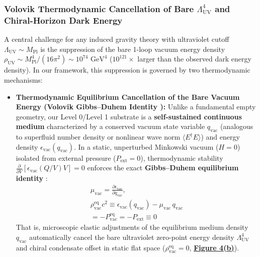 \documentclass[10pt,aps,prd,twocolumn,superscriptaddress,nofootinbib,floatfix,longbibliography,showkeys]{revtex4-2}
\begin{document}
\subsubsection{Volovik Thermodynamic Cancellation of Bare $\Lambda_{\text{UV}}^4$ and Chiral-Horizon Dark Energy}

A central challenge for any induced gravity theory with ultraviolet cutoff $\Lambda_{\text{UV}} \sim M_{\text{Pl}}$ is the suppression of the bare 1-loop vacuum energy density $\rho_{\text{UV}} \sim M_{\text{Pl}}^4 / (16\pi^2) \sim 10^{74}\text{ GeV}^4$ ($10^{121}\times$ larger than the observed dark energy density). In our framework, this suppression is governed by two thermodynamic mechanisms:
\begin{itemize}
  \item \textbf{Thermodynamic Equilibrium Cancellation of the Bare Vacuum Energy (Volovik Gibbs--Duhem Identity \cite{ref15,ref16}):} Unlike a fundamental empty geometry, our Level 0/Level 1 substrate is a \textbf{self-sustained continuous medium} characterized by a conserved vacuum state variable $q_{\text{vac}}$ (analogous to superfluid number density or nonlinear wave norm $\langle E^\dagger E \rangle$) and energy density $\epsilon_{\text{vac}}(q_{\text{vac}})$. In a static, unperturbed Minkowski vacuum ($H = 0$) isolated from external pressure ($P_{\text{ext}} = 0$), thermodynamic stability $\frac{\partial}{\partial V}[\epsilon_{\text{vac}}(Q/V)V] = 0$ enforces the exact \textbf{Gibbs--Duhem equilibrium identity} \cite{ref15,ref16}:
\begin{equation}\begin{gathered}
\mu_{\text{vac}} = \frac{\partial \epsilon_{\text{vac}}}{\partial q_{\text{vac}}}, \\
\rho_{\text{vac}}^{\text{eq}} c^2 \equiv \epsilon_{\text{vac}}(q_{\text{vac}}) - \mu_{\text{vac}}\,q_{\text{vac}} \\
= -P_{\text{vac}}^{\text{eq}} = -P_{\text{ext}} \equiv 0
\end{gathered}\end{equation}
  That is, microscopic elastic adjustments of the equilibrium medium density $q_{\text{vac}}$ automatically cancel the bare ultraviolet zero-point energy density $\Lambda_{\text{UV}}^4$ and chiral condensate offset in static flat space ($\rho_{\text{vac}}^{\text{eq}} = 0$, \textbf{\hyperref[fig:fig4]{Figure 4(b)}}).

\end{itemize}
\end{document}
